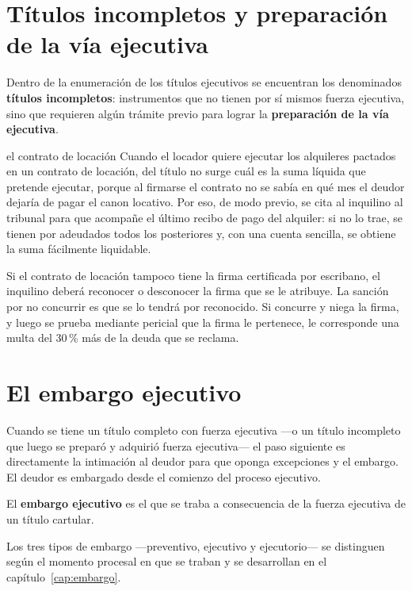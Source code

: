 \documentclass[12pt,oneside]{book}
\begin{document}
\section{Títulos incompletos y preparación de la vía ejecutiva}

Dentro de la enumeración de los títulos ejecutivos se encuentran los denominados \textbf{títulos incompletos}: instrumentos que no tienen por sí mismos fuerza ejecutiva, sino que requieren algún trámite previo para lograr la \textbf{preparación de la vía ejecutiva}.

\begin{example}{el contrato de locación}
Cuando el locador quiere ejecutar los alquileres pactados en un contrato de locación, del título no surge cuál es la suma líquida que pretende ejecutar, porque al firmarse el contrato no se sabía en qué mes el deudor dejaría de pagar el canon locativo. Por eso, de modo previo, se cita al inquilino al tribunal para que acompañe el último recibo de pago del alquiler: si no lo trae, se tienen por adeudados todos los posteriores y, con una cuenta sencilla, se obtiene la suma fácilmente liquidable.
\end{example}

Si el contrato de locación tampoco tiene la firma certificada por escribano, el inquilino deberá reconocer o desconocer la firma que se le atribuye. La sanción por no concurrir es que se lo tendrá por reconocido. Si concurre y niega la firma, y luego se prueba mediante pericial que la firma le pertenece, le corresponde una multa del 30\,\% más de la deuda que se reclama.

\section{El embargo ejecutivo}

Cuando se tiene un título completo con fuerza ejecutiva ---o un título incompleto que luego se preparó y adquirió fuerza ejecutiva--- el paso siguiente es directamente la intimación al deudor para que oponga excepciones y el embargo. El deudor es embargado desde el comienzo del proceso ejecutivo.

El \textbf{embargo ejecutivo} es el que se traba a consecuencia de la fuerza ejecutiva de un título cartular.

Los tres tipos de embargo ---preventivo, ejecutivo y ejecutorio--- se distinguen según el momento procesal en que se traban y se desarrollan en el capítulo~\ref{cap:embargo}.
\end{document}
